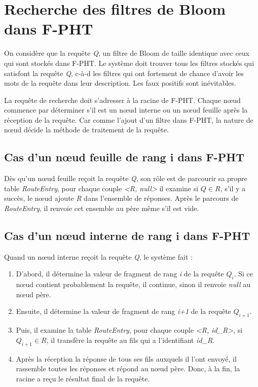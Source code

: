 \documentclass[a4paper,11pt]{report}
\begin{document}
\section{Recherche des filtres de Bloom dans F-PHT}
	On considère que la requête \textit{Q}, un filtre de Bloom de taille identique avec ceux qui sont stockés dans F-PHT. Le système doit trouver tous les filtres stockés qui satisfont la requête \textit{Q}, c-à-d les filtres qui ont fortement de chance d'avoir les mots de la requête dans leur description. Les faux positifs sont inévitables.
	
	La requête de recherche doit s'adresser à la racine de F-PHT. Chaque nœud commence par déterminer s'il est un nœud interne ou un nœud  feuille  après la réception de la requête. Car comme l'ajout d'un filtre dans F-PHT, la nature de nœud décide la méthode de traitement de la requête.
	
\subsection{Cas d'un nœud feuille de rang i dans F-PHT}
	Dès qu'un nœud feuille reçoit la requête \textit{Q}, son rôle est de parcourir sa propre table \textit{RouteEntry}, pour chaque couple \textit{<R, null>} il examine si $Q \in R$, s'il y a succès, le nœud ajoute \textit{R} dans l'ensemble de réponses. Après le parcours de \textit{RouteEntry}, il renvoie cet ensemble au père même s'il est vide.
	
\subsection{Cas d'un nœud interne de rang i dans F-PHT}
	Quand un nœud interne reçoit la requête \textit{Q}, le système fait :
	\begin{enumerate}
		\item D'abord, il détermine la valeur de fragment de rang \textit{i} de la requête \textit{$Q_i$}. Si ce nœud contient probablement la requête, il continue, sinon il renvoie \textit{null} au nœud père.
		\item Ensuite, il détermine la valeur de fragment de rang \textit{i+1} de la requête \textit{$Q_{i+1}$}.
		\item Puis, il examine la table \textit{RouteEntry}, pour chaque couple \textit{<R, id\_R>}, si $Q_{i+1} \in R$, il transfère la requête au fils qui a l'identifiant \textit{id\_R}.
		\item Après la réception la réponse de tous ses fils auxquels il l'ont envoyé, il rassemble toutes les réponses et répond au nœud père. Donc, à la fin, la racine a reçu le résultat final de la requête.
	\end{enumerate}
	
\end{document}

